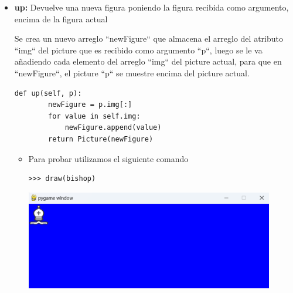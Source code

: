 \documentclass{article}
\begin{document}
\begin{itemize}
  \pagebreak

  \item \textbf{up:} Devuelve una nueva figura poniendo la figura recibida como argumento, encima de la figura actual
  
  \vspace{\baselineskip}

  Se crea un nuevo arreglo ``newFigure`` que almacena el arreglo del atributo ``img`` del picture que es recibido como argumento ``p``, luego se le va añadiendo cada elemento del arreglo ``img`` del picture actual, para que en ``newFigure``, el picture ``p`` se muestre encima del picture actual.  
    \begin{lstlisting}[style=python]
    def up(self, p):
        newFigure = p.img[:]
        for value in self.img:
            newFigure.append(value)
        return Picture(newFigure)
    \end{lstlisting}

    \vspace{\baselineskip}

    \begin{itemize}
      \item Para probar utilizamos el siguiente comando

      \begin{lstlisting}[style=shell]
      >>> draw(bishop)
      \end{lstlisting}
      \begin{minipage}{\linewidth}
        \centering
        \includegraphics[width=0.9\textwidth]{imagenes/p_up1.png}
      \end{minipage}

      \vspace{2\baselineskip}


\end{itemize}
\end{itemize}
\end{document}
